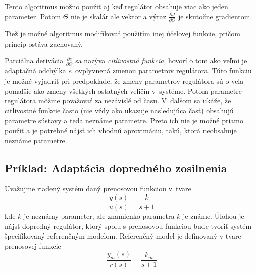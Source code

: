 \documentclass[a4paper, 10pt, ]{article}
\begin{document}
Tento algoritmus možno použiť aj keď regulátor obsahuje viac ako jeden parameter. Potom $\Theta$ nie je skalár ale vektor a výraz $\frac{\partial J}{\partial \Theta}$ je skutočne gradientom.

Tiež je možné algoritmus modifikovať použitím inej účelovej funkcie, pričom princíp ostáva zachovaný.

Parciálna derivácia $\frac{\partial e}{\partial \Theta}$ sa nazýva \emph{citlivostná funkcia}, hovorí o tom ako veľmi je adaptačná odchýlka $e$~ovplyvnená zmenou parametrov regulátora. Túto funkciu je možné vyjadriť pri predpoklade, že zmeny parametrov regulátora sú o veľa pomalšie ako zmeny všetkých ostatných veličín v~systéme. Potom parametre regulátora môžme považovať za nezávislé od času. V~ďalšom sa ukáže, že citlivostné funkcie často (nie vždy ako ukazuje nasledujúca časť) obsahujú parametre sústavy a teda neznáme parametre. Preto ich nie je možné priamo použiť a je potrebné nájsť ich vhodnú aproximáciu, takú, ktorá neobsahuje neznáme parametre.






\subsection{Príklad: Adaptácia dopredného zosilnenia}

Uvažujme riadený systém daný prenosovou funkciou v~tvare
\begin{equation}
	\frac{y(s)}{u(s)} = \frac{k}{s + 1}
\end{equation}
kde $k$ je neznámy parameter, ale znamienko parametra $k$ je známe. Úlohou je nájsť dopredný regulátor, ktorý spolu s prenosovou funkciou bude tvoriť systém špecifikovaný referenčným modelom. Referenčný model je definovaný v tvare prenosovej funkcie
\begin{equation} \label{pfRefModelu}
	\frac{y_m(s)}{r(s)} = \frac{k_m}{s + 1}
\end{equation}
\end{document}
